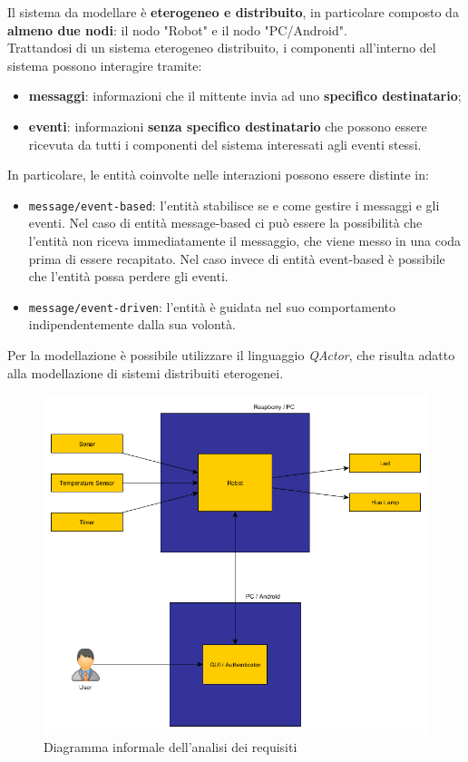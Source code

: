 \documentclass{llncs}
\newcommand{\code}[1]{{\color{blue}\small{\texttt{#1}}}}
\newcommand{\qa}{\textsf{\textit{QActor}}}
\begin{document}
Il sistema da modellare è \textbf{eterogeneo e distribuito}, in particolare composto da \textbf{almeno due nodi}: il nodo "Robot" e il nodo "PC/Android". \\
Trattandosi di un sistema eterogeneo distribuito, i componenti all'interno del sistema possono interagire tramite:
\begin{itemize}
	\setlength\itemsep{0em}
	\item \textbf{messaggi}: informazioni che il mittente invia ad uno \textbf{specifico destinatario};
	\item \textbf{eventi}: informazioni \textbf{senza specifico destinatario} che possono essere ricevuta da tutti i componenti del sistema interessati agli eventi stessi.
\end{itemize}
In particolare, le entità coinvolte nelle interazioni possono essere distinte in:
\begin{itemize}
	\setlength\itemsep{0em}
	\item \code{message/event-based}: l'entità stabilisce se e come gestire i messaggi e gli eventi. Nel caso di entità message-based ci può essere la possibilità che l'entità non riceva immediatamente il messaggio, che viene messo in una coda prima di essere recapitato. Nel caso invece di entità event-based è possibile che l'entità possa perdere gli eventi.
	\item \code{message/event-driven}: l'entità è guidata nel suo comportamento indipendentemente dalla sua volontà.	
\end{itemize}

Per la modellazione è possibile utilizzare il linguaggio \qa, che risulta adatto alla modellazione di sistemi distribuiti eterogenei. 

\begin{figure}[h]
	\centering
	\includegraphics[scale=0.4]{img/requirements_analysis.png}
	\caption{Diagramma informale dell'analisi dei requisiti}
	\label{fig:reqAnalysis}
\end{figure}
\end{document}
